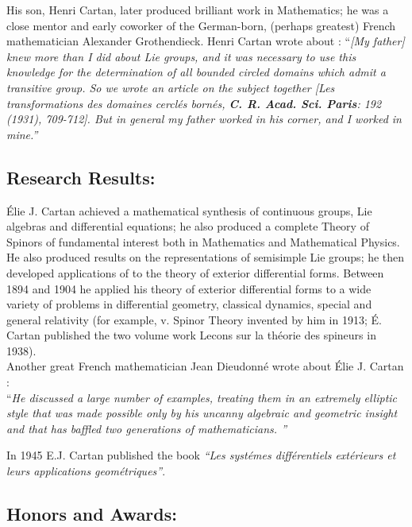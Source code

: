 \documentclass[12pt]{article}
\theoremstyle{plain}
\theoremstyle{definition}
\numberwithin{equation}{section}
\begin{document}
His son, Henri Cartan, later produced brilliant work in Mathematics; he was a close mentor
and early coworker of the German-born, (perhaps greatest) French mathematician Alexander Grothendieck.
Henri Cartan wrote about 
:
``{\em [My father] knew more than I did about Lie groups, and it was necessary to use this knowledge for the determination of all bounded circled domains which admit a transitive group. So we wrote an article on the subject together [Les transformations des domaines cercl\'es born\'es, \textbf{C. R. Acad. Sci. Paris}: 192 (1931), 709-712]. But in general my father worked in his corner, and I worked in mine.''}

\subsection{Research Results:}

\'{E}lie J. Cartan achieved a mathematical synthesis of continuous groups, Lie algebras and differential equations; he also produced a complete Theory of Spinors of fundamental interest both in Mathematics and Mathematical Physics. 
He also produced results on the representations of semisimple Lie groups; he then developed applications of 
 to the theory of exterior differential forms. Between 1894 and 1904 he applied his theory of exterior differential forms to a wide variety of problems in differential geometry, classical dynamics, special and general relativity (for example, v. Spinor Theory invented by him in 1913; \'E. Cartan published the two volume work Lecons sur la th\'eorie des spineurs in 1938).\\

Another great French mathematician Jean Dieudonn\'e wrote about \'Elie J. Cartan : \\ 

``{\em He discussed a large number of examples, treating them in an extremely elliptic style that was made possible only by his uncanny algebraic and geometric insight and that has baffled two generations of mathematicians. ''}

In 1945 E.J. Cartan published the book {\em ``Les syst\'emes diff\'erentiels ext\'erieurs et leurs applications geom\'etriques''}. 

\subsection{Honors and Awards:}
\end{document}
